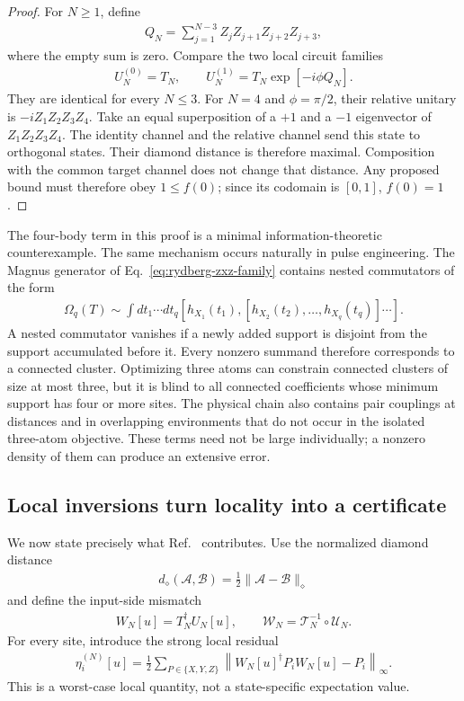 \begin{proof}
For $N\geq1$, define
\begin{align}
Q_N=\sum_{j=1}^{N-3}Z_jZ_{j+1}Z_{j+2}Z_{j+3},
\end{align}
where the empty sum is zero.  Compare the two local circuit families
\begin{align}
U_N^{(0)}=T_N,
\qquad
U_N^{(1)}=T_N\exp[-i\phi Q_N].
\end{align}
They are identical for every $N\leq3$.  For $N=4$ and $\phi=\pi/2$, their
relative unitary is $-iZ_1Z_2Z_3Z_4$.  Take an equal superposition of a
$+1$ and a $-1$ eigenvector of $Z_1Z_2Z_3Z_4$.  The identity channel and the
relative channel send this state to orthogonal states.  Their diamond distance
is therefore maximal.  Composition with the common target channel does not
change that distance.  Any proposed bound must therefore obey $1\leq f(0)$;
since its codomain is $[0,1]$, $f(0)=1$.
\end{proof}

The four-body term in this proof is a minimal information-theoretic
counterexample.  The same mechanism occurs naturally in pulse engineering.
The Magnus generator of Eq.~\eqref{eq:rydberg-zxz-family} contains nested
commutators of the form
\begin{align}
\Omega_q(T)\sim
\int dt_1\cdots dt_q
[h_{X_1}(t_1),[h_{X_2}(t_2),\ldots,h_{X_q}(t_q)]\cdots].
\label{eq:magnus-connected-clusters}
\end{align}
A nested commutator vanishes if a newly added support is disjoint from the
support accumulated before it.  Every nonzero summand therefore corresponds
to a connected cluster.  Optimizing three atoms can constrain connected
clusters of size at most three, but it is blind to all connected coefficients
whose minimum support has four or more sites.  The physical chain also
contains pair couplings at distances and in overlapping environments that do
not occur in the isolated three-atom objective.  These terms need not be
large individually; a nonzero density of them can produce an extensive error.

\subsection{Local inversions turn locality into a certificate}

We now state precisely what Ref.~\cite{huang_2024_learning} contributes.  Use
the normalized diamond distance
\begin{align}
d_\diamond(\mathcal A,\mathcal B)
=\frac{1}{2}\|\mathcal A-\mathcal B\|_\diamond
\end{align}
and define the input-side mismatch
\begin{align}
W_N[u]=T_N^\dagger U_N[u],
\qquad
\mathcal W_N=\mathcal T_N^{-1}\circ\mathcal U_N.
\label{eq:zxz-mismatch-unitary}
\end{align}
For every site, introduce the strong local residual
\begin{align}
\eta_i^{(N)}[u]
=\frac{1}{2}\sum_{P\in\{X,Y,Z\}}
\left\|W_N[u]^\dagger P_iW_N[u]-P_i\right\|_\infty.
\label{eq:strong-local-residual}
\end{align}
This is a worst-case local quantity, not a state-specific expectation value.

